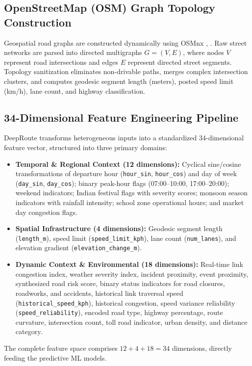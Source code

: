 \documentclass[journal]{IEEEtran}
\begin{document}
\subsection{OpenStreetMap (OSM) Graph Topology Construction}
Geospatial road graphs are constructed dynamically using OSMnx \cite{ref10}, \cite{ref36}. Raw street networks are parsed into directed multigraphs $G = (V, E)$, where nodes $V$ represent road intersections and edges $E$ represent directed street segments. Topology sanitization eliminates non-drivable paths, merges complex intersection clusters, and computes geodesic segment length (meters), posted speed limit (km/h), lane count, and highway classification.

\subsection{34-Dimensional Feature Engineering Pipeline}
DeepRoute transforms heterogeneous inputs into a standardized 34-dimensional feature vector, structured into three primary domains:
\begin{itemize}
    \item \textbf{Temporal \& Regional Context (12 dimensions):} Cyclical sine/cosine transformations of departure hour (\texttt{hour\_sin}, \texttt{hour\_cos}) and day of week (\texttt{day\_sin}, \texttt{day\_cos}); binary peak-hour flags (07:00--10:00, 17:00--20:00); weekend indicators; Indian festival flags with severity scores; monsoon season indicators with rainfall intensity; school zone operational hours; and market day congestion flags.
    \item \textbf{Spatial Infrastructure (4 dimensions):} Geodesic segment length (\texttt{length\_m}), speed limit (\texttt{speed\_limit\_kph}), lane count (\texttt{num\_lanes}), and elevation gradient (\texttt{elevation\_change\_m}).
    \item \textbf{Dynamic Context \& Environmental (18 dimensions):} Real-time link congestion index, weather severity index, incident proximity, event proximity, synthesized road risk score, binary status indicators for road closures, roadworks, and accidents, historical link traversal speed (\texttt{historical\_speed\_kph}), historical congestion, speed variance reliability (\texttt{speed\_reliability}), encoded road type, highway percentage, route curvature, intersection count, toll road indicator, urban density, and distance category.
\end{itemize}

The complete feature space comprises $12 + 4 + 18 = 34$ dimensions, directly feeding the predictive ML models.
\end{document}
